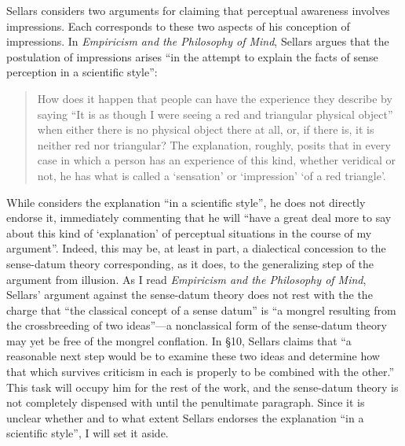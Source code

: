 \documentclass[12pt]{article}
\begin{document}
Sellars considers two arguments for claiming that perceptual awareness involves impressions. Each corresponds to these two aspects of his conception of impressions. In \emph{Empiricism and the Philosophy of Mind}, Sellars argues that the postulation of impressions arises ``in the attempt to explain the facts of sense perception in a scientific style'':
\begin{quote}
    How does it happen that people can have the experience they describe by saying ``It is as though I were seeing a red and triangular physical object'' when either there is no physical object there at all, or, if there is, it is neither red nor triangular? The explanation, roughly, posits that in every case in which a person has an experience of this kind, whether veridical or not, he has what is called a `sensation' or `impression' `of a red triangle'.  \citep[§7]{Sellars:1956xp} %
\end{quote}
While \cite[§7]{Sellars:1956xp} considers the explanation ``in a scientific style'', he does not directly endorse it, immediately commenting that he will ``have a great deal more to say about this kind of `explanation' of perceptual situations in the course of my argument''. Indeed, this may be, at least in part, a dialectical concession to the sense-datum theory corresponding, as it does, to the generalizing step of the argument from illusion. As I read \emph{Empiricism and the Philosophy of Mind}, Sellars' \citeyearpar[§7]{Sellars:1956xp} argument against the sense-datum theory does not rest with the the charge that ``the classical concept of a sense datum'' is ``a mongrel resulting from the crossbreeding of two ideas''---a nonclassical form of the sense-datum theory may yet be free of the mongrel conflation. In §10, Sellars claims that ``a reasonable next step would be to examine these two ideas and determine how that which survives criticism in each is properly to be combined with the other.'' This task will occupy him for the rest of the work, and the sense-datum theory is not completely dispensed with until the penultimate paragraph. Since it is unclear whether and to what extent Sellars endorses the explanation ``in a scientific style'', I will set it aside.
\end{document}
